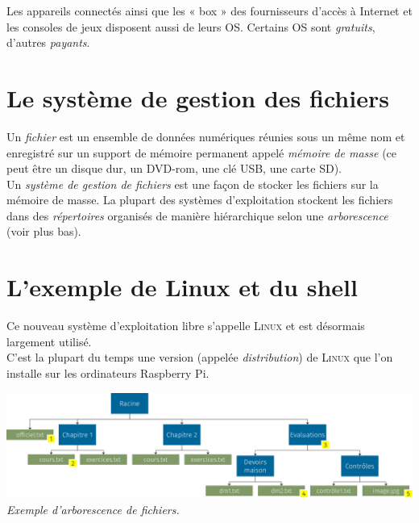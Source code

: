 
	Les appareils connectés ainsi que les « box »  des fournisseurs d'accès à Internet et les consoles de jeux disposent aussi de leurs OS.
	Certains OS sont \textit{gratuits}, d'autres \textit{payants}.
	
	\section{Le système de gestion des fichiers}
	
	Un \textit{fichier} est un ensemble de données numériques réunies sous un même nom et enregistré sur un support de mémoire permanent appelé \textit{mémoire de masse} (ce peut être un disque dur, un DVD-rom, une clé USB, une carte SD).\\
	Un \textit{système de gestion de fichiers} est une façon de stocker les fichiers sur la mémoire de masse. La plupart des systèmes d'exploitation stockent les fichiers dans des \textit{répertoires} organisés de manière hiérarchique selon une \textit{arborescence} (voir plus bas).

	\section{L'exemple de Linux et du shell}

	\medskip\par
	Ce nouveau système d'exploitation libre s'appelle \textsc{Linux} et est désormais largement utilisé.\\
	C'est la plupart du temps une version (appelée \textit{distribution}) de \textsc{Linux} que l'on installe sur les ordinateurs Raspberry Pi.
	
	\begin{center}
		\includegraphics[width=\textwidth]{ch-sysex/img/hier.png}\\
		\footnotesize\textit{Exemple d'arborescence de fichiers.}
	\end{center}

